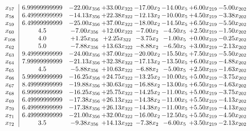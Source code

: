 \documentclass[8pt]{article}
\begin{document}
\[\begin{array}{c| c c@{\hskip 2pt} c@{\hskip 2pt} c@{\hskip 2pt} c@{\hskip 2pt} c@{\hskip 2pt} c@{\hskip 2pt} }
 x_{57}   &  6.99999999999 & -22.00 x_{356} & + 33.00 x_{322} & -17.00 x_{2} & -14.00 x_{5} & +  6.00 x_{219} & -5.00 x_{202}\\
 x_{58}   &  6.49999999999 & -14.13 x_{356} & + 22.38 x_{322} & -12.13 x_{2} & -10.00 x_{5} & +  4.50 x_{219} & -3.38 x_{202}\\
 x_{59}   &  6.49999999999 & -25.00 x_{356} & + 37.00 x_{322} & -18.00 x_{2} & -14.50 x_{5} & +  6.50 x_{219} & -5.50 x_{202}\\
 x_{60}   &  4.5 & -7.00 x_{356} & + 12.00 x_{322} & -7.00 x_{2} & -4.50 x_{5} & +  2.50 x_{219} & -1.50 x_{202}\\
 x_{108}   &  4.0 & +  1.25 x_{356} & +  2.25 x_{322} & -3.75 x_{2} & -1.00 x_{5} & +  0.00 x_{219} & -0.25 x_{202}\\
 x_{62}   &  5.0 & -7.88 x_{356} & + 13.63 x_{322} & -8.88 x_{2} & -6.50 x_{5} & +  3.00 x_{219} & -2.13 x_{202}\\
 x_{63}   &  9.49999999999 & -24.00 x_{356} & + 37.00 x_{322} & -20.00 x_{2} & -15.50 x_{5} & +  7.50 x_{219} & -5.50 x_{202}\\
 x_{64}   &  7.99999999999 & -21.13 x_{356} & + 32.38 x_{322} & -17.13 x_{2} & -13.50 x_{5} & +  6.00 x_{219} & -4.88 x_{202}\\
 x_{65}   &  4.5 & -5.88 x_{356} & + 10.63 x_{322} & -6.88 x_{2} & -5.00 x_{5} & +  2.50 x_{219} & -1.63 x_{202}\\
 x_{66}   &  5.99999999999 & -16.25 x_{356} & + 24.75 x_{322} & -13.25 x_{2} & -10.00 x_{5} & +  5.00 x_{219} & -3.75 x_{202}\\
 x_{67}   &  8.49999999999 & -19.88 x_{356} & + 30.63 x_{322} & -16.88 x_{2} & -13.00 x_{5} & +  6.50 x_{219} & -4.63 x_{202}\\
 x_{68}   &  6.99999999999 & -16.25 x_{356} & + 25.75 x_{322} & -14.25 x_{2} & -11.00 x_{5} & +  5.00 x_{219} & -3.75 x_{202}\\
 x_{69}   &  6.49999999999 & -17.38 x_{356} & + 26.13 x_{322} & -14.38 x_{2} & -11.00 x_{5} & +  5.50 x_{219} & -4.13 x_{202}\\
 x_{70}   &  6.49999999999 & -17.38 x_{356} & + 26.13 x_{322} & -14.38 x_{2} & -11.00 x_{5} & +  5.50 x_{219} & -4.13 x_{202}\\
 x_{71}   &  6.49999999999 & -21.00 x_{356} & + 32.00 x_{322} & -16.00 x_{2} & -12.50 x_{5} & +  5.50 x_{219} & -4.50 x_{202}\\
 x_{72}   &  3.5 & -9.38 x_{356} & + 14.13 x_{322} & -7.38 x_{2} & -6.00 x_{5} & +  3.50 x_{219} & -2.13 x_{202}\\

\end{array}\]
\end{document}
